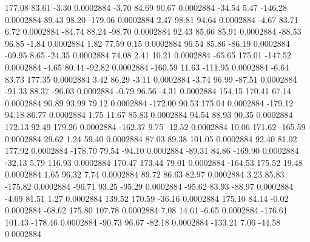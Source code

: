       177.08       83.61       -3.30     0.0002884
       -3.70       84.69       90.67     0.0002884
      -34.54        5.47     -146.28     0.0002884
       89.43       98.20     -179.06     0.0002884
        2.47       98.81       94.64     0.0002884
       -4.67       83.71        6.72     0.0002884
      -84.74       88.24      -98.70     0.0002884
       92.43       85.66       85.91     0.0002884
      -88.53       96.85       -1.84     0.0002884
        1.82       77.59        0.15     0.0002884
       96.54       85.86      -86.19     0.0002884
      -69.95        8.65      -24.35     0.0002884
       74.08        2.41       10.21     0.0002884
      -65.65      175.01     -147.52     0.0002884
       -4.65       80.44      -92.82     0.0002884
     -160.59       11.63     -111.95     0.0002884
       -6.64       83.73      177.35     0.0002884
        3.42       86.29       -3.11     0.0002884
       -3.74       96.99      -87.51     0.0002884
      -91.33       88.37      -96.03     0.0002884
       -0.79       96.56       -4.31     0.0002884
      154.15      170.41       67.14     0.0002884
       90.89       93.99       79.12     0.0002884
     -172.00       90.53      175.04     0.0002884
     -179.12       94.18       86.77     0.0002884
        1.75       11.67       85.83     0.0002884
       94.54       88.93       90.35     0.0002884
      172.13       92.49      179.26     0.0002884
     -162.37        9.75      -12.52     0.0002884
       10.06      171.62     -165.59     0.0002884
       29.62        1.24       59.40     0.0002884
       87.03       89.38      101.05     0.0002884
       92.40       81.02      177.92     0.0002884
     -178.70       79.54      -94.10     0.0002884
      -89.31       84.86     -169.90     0.0002884
      -32.13        5.79      116.93     0.0002884
      170.47      173.44       79.01     0.0002884
     -164.53      175.52       19.48     0.0002884
        1.65       96.32        7.74     0.0002884
       89.72       86.63       82.97     0.0002884
        3.23       85.83     -175.82     0.0002884
      -96.71       93.25      -95.29     0.0002884
      -95.62       83.93      -88.97     0.0002884
       -4.69       81.51        1.27     0.0002884
      139.52      170.59      -36.16     0.0002884
      175.10       84.14       -0.02     0.0002884
      -68.62      175.80      107.78     0.0002884
        7.08       14.61       -6.65     0.0002884
     -176.61      101.43     -178.46     0.0002884
      -90.73       96.67      -82.18     0.0002884
     -133.21        7.06      -44.58     0.0002884
